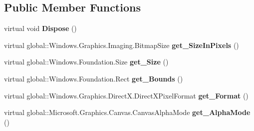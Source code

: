 \subsection*{Public Member Functions}
\begin{DoxyCompactItemize}
\item 
\mbox{\label{class_microsoft_1_1_graphics_1_1_canvas_1_1_canvas_bitmap_ad658f3d180a76d7516d77f6b7fd64ed0}} 
virtual void {\bfseries Dispose} ()
\item 
\mbox{\label{class_microsoft_1_1_graphics_1_1_canvas_1_1_canvas_bitmap_a134d2eb2e2f01c81d58f22008c36bf46}} 
virtual global\+::\+Windows.\+Graphics.\+Imaging.\+Bitmap\+Size {\bfseries get\+\_\+\+Size\+In\+Pixels} ()
\item 
\mbox{\label{class_microsoft_1_1_graphics_1_1_canvas_1_1_canvas_bitmap_a4f2a3dcc57793a0c2a772d60467769b7}} 
virtual global\+::\+Windows.\+Foundation.\+Size {\bfseries get\+\_\+\+Size} ()
\item 
\mbox{\label{class_microsoft_1_1_graphics_1_1_canvas_1_1_canvas_bitmap_ac23e155a2d08d8412d714919eca3072b}} 
virtual global\+::\+Windows.\+Foundation.\+Rect {\bfseries get\+\_\+\+Bounds} ()
\item 
\mbox{\label{class_microsoft_1_1_graphics_1_1_canvas_1_1_canvas_bitmap_a82185afb0f99d94f364c3bff99691e22}} 
virtual global\+::\+Windows.\+Graphics.\+Direct\+X.\+Direct\+X\+Pixel\+Format {\bfseries get\+\_\+\+Format} ()
\item 
\mbox{\label{class_microsoft_1_1_graphics_1_1_canvas_1_1_canvas_bitmap_af6a87ba42d42fdd078bd722587c14731}} 
virtual global\+::\+Microsoft.\+Graphics.\+Canvas.\+Canvas\+Alpha\+Mode {\bfseries get\+\_\+\+Alpha\+Mode} ()
\item 
\mbox{\label{class_microsoft_1_1_graphics_1_1_canvas_1_1_canvas_bitmap_a793b0a5ddd66309a14c0ad273202d06d}} 

\end{DoxyCompactItemize}
